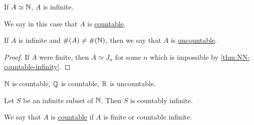 \begin{corollary}
    If $A\simeq \mathbb N$, $A$ is infinite.

    We say in this case that $A$ is \ul{countable}.

    If $A$ is infinite and $\#(A)\neq \#(\mathbb N)$, then we say that $A$ is \ul{uncountable}.
\end{corollary}
\begin{proof}
    If $A$ were finite, then $A\simeq J_n$ for some $n$ which is impossible by \cref{thm:NN-countable-infinity}.
\end{proof}
\begin{example}
    $\mathbb N$ is countable, $\mathbb Q$ is countable, $\mathbb R$ is uncountable.
\end{example}

\begin{corollary}
    Let $S$ be an infinite subset of $\mathbb N$. Then $S$ is countably infinite.
\end{corollary}

\begin{definition}[Countability]
    \label{defn:countability}
    We say that $A$ is \ul{countable} if $A$ is finite or countable infinite.
\end{definition}